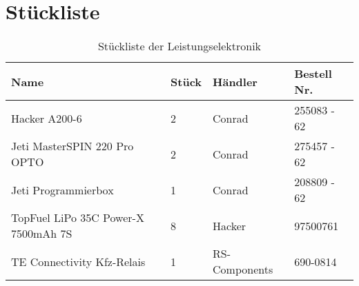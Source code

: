 \section{Stückliste}

\begin{table}[h]
    \centering
    \begin{tabular}{|l|l|l|l|}
        \hline
    Name                         & Stück & Händler & Bestell Nr. \\\hline
    Hacker A200-6                & 2      & Conrad  & 255083 - 62 \\
    Jeti MasterSPIN 220 Pro OPTO & 2      & Conrad  & 275457 - 62 \\
    Jeti Programmierbox          & 1      & Conrad  & 208809 - 62 \\
    TopFuel LiPo 35C Power-X 7500mAh 7S & 8 & Hacker & 97500761 \\
    TE Connectivity Kfz-Relais & 1 & RS-Components & 690-0814 \\\hline
    \end{tabular}
    \caption{Stückliste der Leistungselektronik}
\end{table}